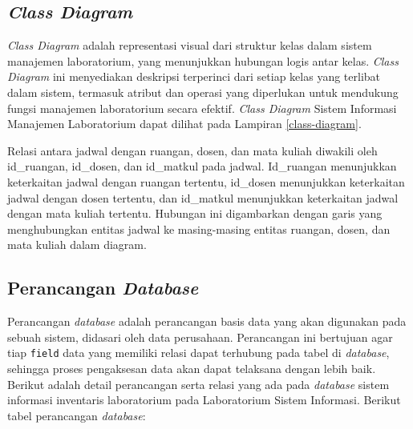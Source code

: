 \subsection{\textit{Class Diagram}}
\textit{Class Diagram} adalah representasi visual dari struktur kelas dalam sistem manajemen laboratorium, yang menunjukkan hubungan logis antar kelas. \textit{Class Diagram} ini menyediakan deskripsi terperinci dari setiap kelas yang terlibat dalam sistem, termasuk atribut dan operasi yang diperlukan untuk mendukung fungsi manajemen laboratorium secara efektif. \textit{Class Diagram} Sistem Informasi Manajemen Laboratorium dapat dilihat pada Lampiran \ref{class-diagram}.

Relasi antara jadwal dengan ruangan, dosen, dan mata kuliah diwakili oleh id\_ruangan, id\_dosen, dan id\_matkul pada jadwal. Id\_ruangan menunjukkan keterkaitan jadwal dengan ruangan tertentu, id\_dosen menunjukkan keterkaitan jadwal dengan dosen tertentu, dan id\_matkul menunjukkan keterkaitan jadwal dengan mata kuliah tertentu. Hubungan ini digambarkan dengan garis yang menghubungkan entitas jadwal ke masing-masing entitas ruangan, dosen, dan mata kuliah dalam diagram.

\subsection{Perancangan \textit{Database}}
Perancangan \textit{database} adalah perancangan basis data yang akan digunakan pada sebuah sistem, didasari oleh data perusahaan. Perancangan ini bertujuan agar tiap \texttt{field} data yang memiliki relasi dapat terhubung pada tabel di \textit{database}, sehingga proses pengaksesan data akan dapat telaksana dengan lebih baik. Berikut adalah detail perancangan serta relasi yang ada pada \textit{database} sistem informasi inventaris laboratorium pada Laboratorium Sistem Informasi. Berikut tabel perancangan \textit{database}:

